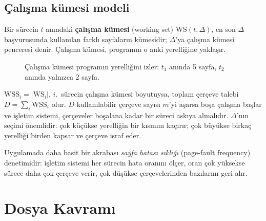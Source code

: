 \documentclass[11pt,a4paper]{article}
\newcommand{\term}[1]{\textbf{\color{mintdeep}#1}}
\begin{document}
\subsection{Çalışma kümesi modeli}

Bir sürecin $t$ anındaki \term{çalışma kümesi} (working set) $\text{WS}(t,\Delta)$, en son $\Delta$ başvurusunda kullanılan farklı sayfaların kümesidir; $\Delta$'ya çalışma kümesi penceresi denir. Çalışma kümesi, programın o anki yerelliğine yaklaşır.

\begin{figure}[H]
\centering
{}
\caption{Çalışma kümesi programın yerelliğini izler: $t_1$ anında 5 sayfa, $t_2$ anında yalnızca 2 sayfa.}
\end{figure}

$\text{WSS}_i = |\text{WS}_i|$, $i$.\ sürecin çalışma kümesi boyutuysa, toplam çerçeve talebi $D = \sum_i \text{WSS}_i$ olur. $D$ kullanılabilir çerçeve sayısı $m$'yi aşarsa boşa çalışma başlar ve işletim sistemi, çerçeveler boşalana kadar bir süreci askıya almalıdır. $\Delta$'nın seçimi önemlidir: çok küçükse yerelliğin bir kısmını kaçırır; çok büyükse birkaç yerelliği birden kapsar ve çerçeve israf eder.

Uygulamada daha basit bir akrabası \emph{sayfa hatası sıklığı} (page-fault frequency) denetimidir: işletim sistemi her sürecin hata oranını ölçer, oran çok yüksekse sürece daha çok çerçeve verir, çok düşükse çerçevelerinden bazılarını geri alır.

\section{Dosya Kavramı}
\end{document}
